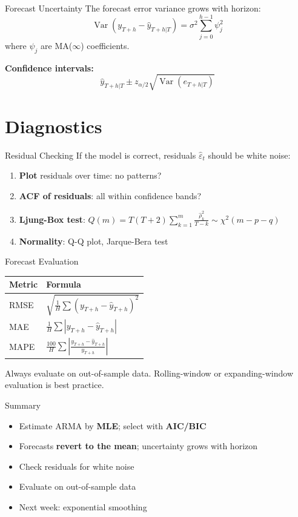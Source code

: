\documentclass[aspectratio=169, 10pt]{beamer}
\begin{document}
\begin{frame}{Forecast Uncertainty}
The forecast error variance grows with horizon:
\[
\operatorname{Var}(y_{T+h} - \hat{y}_{T+h|T}) = \sigma^2 \sum_{j=0}^{h-1} \psi_j^2
\]
where $\psi_j$ are MA($\infty$) coefficients.

\vspace{0.5em}
\textbf{Confidence intervals:}
\[
\hat{y}_{T+h|T} \pm z_{\alpha/2} \sqrt{\operatorname{Var}(e_{T+h|T})}
\]
\end{frame}

\section{Diagnostics}

\begin{frame}{Residual Checking}
If the model is correct, residuals $\hat\varepsilon_t$ should be white noise:
\begin{enumerate}
    \item \textbf{Plot} residuals over time: no patterns?
    \item \textbf{ACF of residuals}: all within confidence bands?
    \item \textbf{Ljung-Box test}: $Q(m) = T(T+2)\sum_{k=1}^{m} \frac{\hat\rho_k^2}{T-k} \sim \chi^2(m-p-q)$
    \item \textbf{Normality}: Q-Q plot, Jarque-Bera test
\end{enumerate}
\end{frame}

\begin{frame}{Forecast Evaluation}
\begin{center}
\begin{tabular}{ll}
\toprule
\textbf{Metric} & \textbf{Formula} \\
\midrule
RMSE & $\sqrt{\frac{1}{H}\sum(y_{T+h} - \hat{y}_{T+h})^2}$ \\[4pt]
MAE & $\frac{1}{H}\sum|y_{T+h} - \hat{y}_{T+h}|$ \\[4pt]
MAPE & $\frac{100}{H}\sum\left|\frac{y_{T+h} - \hat{y}_{T+h}}{y_{T+h}}\right|$ \\
\bottomrule
\end{tabular}
\end{center}

\vspace{0.5em}
Always evaluate on \alert{out-of-sample} data. Rolling-window or expanding-window evaluation is best practice.
\end{frame}

\begin{frame}{Summary}
\begin{itemize}
    \item Estimate ARMA by \textbf{MLE}; select with \textbf{AIC/BIC}
    \item Forecasts \textbf{revert to the mean}; uncertainty grows with horizon
    \item Check residuals for white noise
    \item Evaluate on \alert{out-of-sample} data
    \item Next week: \alert{exponential smoothing}
\end{itemize}
\end{frame}
\end{document}
